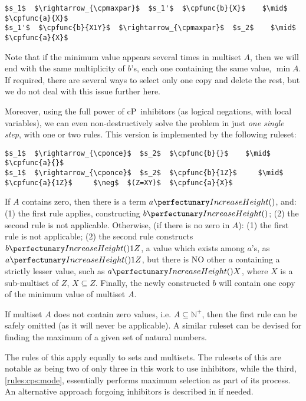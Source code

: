 \lstset{xleftmargin=.5in, xrightmargin=.5in} 
\begin{lstlisting}
$s_1$  $\rightarrow_{\cpmaxpar}$  $s_1'$  $\cpfunc{b}{X}$    $\mid$  $\cpfunc{a}{X}$  
$s_1'$  $\cpfunc{b}{X1Y}$  $\rightarrow_{\cpmaxpar}$  $s_2$    $\mid$  $\cpfunc{a}{X}$  
\end{lstlisting}

Note that if the minimum value appears several times in multiset \(A\), 
then we will end with the same multiplicity of \(b\)'s, each one containing the same value, \(\mathop{min} A\).
If required, there are several ways to select only one copy and delete the rest, but we do not deal with this issue further here.

Moreover, using the full power of cP~inhibitors (as logical negations, with local variables), 
we can even non-destructively solve the problem in just \emph{one single step},
with one or two rules.
This version is implemented by the following \gls{ruleset}:

\lstset{xleftmargin=.5in, xrightmargin=.5in} 
\begin{lstlisting}
$s_1$  $\rightarrow_{\cponce}$  $s_2$  $\cpfunc{b}{}$    $\mid$  $\cpfunc{a}{}$
$s_1$  $\rightarrow_{\cponce}$  $s_2$  $\cpfunc{b}{1Z}$     $\mid$  $\cpfunc{a}{1Z}$     $\neg$  $(Z=XY)$  $\cpfunc{a}{X}$
\end{lstlisting}

If \(A\) contains zero, then there is a term \(\cpfunc{a}{}\), and: (1) the first rule applies, constructing \(\cpfunc{b}{}\); (2) the second rule is not applicable.
Otherwise, (if there is no zero in \(A\)): (1) the first rule is not applicable; (2) the second rule constructs \(\cpfunc{b}{1Z}\), 
a value which exists among \(a\)'s, as \(\cpfunc{a}{1Z}\), but there is NO other \(a\) containing a strictly lesser value, such as \(\cpfunc{a}{X}\),
where \(X\) is a sub-multiset of \(Z\), \(X \subseteq Z\).
Finally, the newly constructed \(b\) will contain one copy of the minimum value of multiset \(A\).

If multiset \(A\) does not contain zero values, i.e. \(A \subseteq \mathbb{N}^+\), then the first rule can be safely omitted (as it will never be applicable). 
A similar \gls{ruleset} can be devised for finding the maximum of a given set of natural numbers.

The rules of this  apply equally to sets and multisets.  The \glspl{ruleset} of this   are notable as being two of only three in this work to use inhibitors, while the third, \cref{rules:cps:mode}, essentially performs maximum selection as part of its process.  An alternative approach forgoing inhibitors is described in \cite{Nicolescu2018} if needed.


